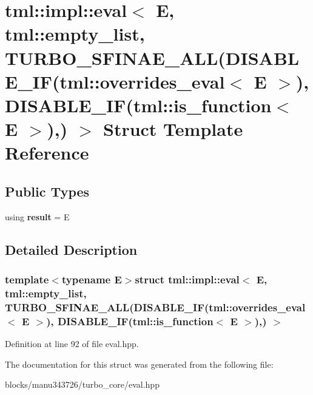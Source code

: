 \hypertarget{structtml_1_1impl_1_1eval_3_01_e_00_01tml_1_1empty__list_00_01_t_u_r_b_o___s_f_i_n_a_e___a_l_l_0ed99ceba3b5fc0189ef4c38c7687fd80}{\section{tml\+:\+:impl\+:\+:eval$<$ E, tml\+:\+:empty\+\_\+list, T\+U\+R\+B\+O\+\_\+\+S\+F\+I\+N\+A\+E\+\_\+\+A\+L\+L(D\+I\+S\+A\+B\+L\+E\+\_\+\+I\+F(tml\+:\+:overrides\+\_\+eval$<$ E $>$), D\+I\+S\+A\+B\+L\+E\+\_\+\+I\+F(tml\+:\+:is\+\_\+function$<$ E $>$),) $>$ Struct Template Reference}
\label{structtml_1_1impl_1_1eval_3_01_e_00_01tml_1_1empty__list_00_01_t_u_r_b_o___s_f_i_n_a_e___a_l_l_0ed99ceba3b5fc0189ef4c38c7687fd80}
}
\subsection*{Public Types}
\begin{DoxyCompactItemize}
\item 
\hypertarget{structtml_1_1impl_1_1eval_3_01_e_00_01tml_1_1empty__list_00_01_t_u_r_b_o___s_f_i_n_a_e___a_l_l_0ed99ceba3b5fc0189ef4c38c7687fd80_a5bfcca838a7a9837d134363c05689392}{using {\bfseries result} = E}\label{structtml_1_1impl_1_1eval_3_01_e_00_01tml_1_1empty__list_00_01_t_u_r_b_o___s_f_i_n_a_e___a_l_l_0ed99ceba3b5fc0189ef4c38c7687fd80_a5bfcca838a7a9837d134363c05689392}

\end{DoxyCompactItemize}


\subsection{Detailed Description}
\subsubsection*{template$<$typename E$>$struct tml\+::impl\+::eval$<$ E, tml\+::empty\+\_\+list, T\+U\+R\+B\+O\+\_\+\+S\+F\+I\+N\+A\+E\+\_\+\+A\+L\+L(\+D\+I\+S\+A\+B\+L\+E\+\_\+\+I\+F(tml\+::overrides\+\_\+eval$<$ E $>$), D\+I\+S\+A\+B\+L\+E\+\_\+\+I\+F(tml\+::is\+\_\+function$<$ E $>$),) $>$}



Definition at line 92 of file eval.\+hpp.



The documentation for this struct was generated from the following file\+:\begin{DoxyCompactItemize}
\item 
blocks/manu343726/turbo\+\_\+core/eval.\+hpp\end{DoxyCompactItemize}
